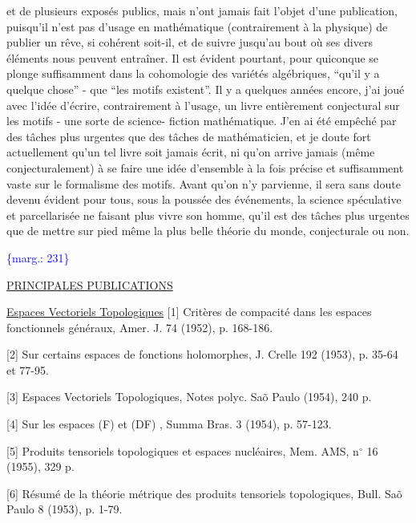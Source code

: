 \documentclass[11pt]{article}
\newcommand{\scanpage}[1]{\par\bigskip\noindent{\small\sffamily[scan #1]}\par}
\newcommand{\mspage}[1]{{\small\sffamily[p.\,#1]}}
\newcommand{\margin}[1]{\textcolor{blue}{\{\textsf{marg.:} #1\}}}
\newcommand{\uline}[1]{\underline{#1}}
\begin{document}
et de plusieurs exposés publics, mais n'ont jamais
fait l'objet d'une publication, puisqu'il n'est pas
d'usage en mathématique (contrairement à la physique)
de publier un rêve, si cohérent soit-il, et de suivre
jusqu'au bout où ses divers éléments nous peuvent entraîner.
Il est évident pourtant, pour quiconque se plonge
suffisamment dans la cohomologie des variétés algébriques,
``qu'il y a quelque chose'' - que ``les motifs existent''.
Il y a quelques années encore, j'ai joué avec l'idée
d'écrire, contrairement à l'usage, un livre entièrement
conjectural sur les motifs - une sorte de science-%
fiction mathématique. J'en ai été empêché par des
tâches plus urgentes que des tâches de mathématicien,
et je doute fort actuellement qu'un tel livre soit
jamais écrit, ni qu'on arrive jamais (même conjecturalement)
à se faire une idée d'ensemble à la fois précise et
suffisamment vaste sur le formalisme des motifs. Avant
qu'on n'y parvienne, il sera sans doute devenu évident
pour tous, sous la poussée des événements, la science
spéculative et parcellarisée ne faisant plus vivre son
homme, qu'il est des tâches plus urgentes que de mettre
sur pied même la plus belle théorie du monde, conjecturale
ou non.

\margin{231}

\clearpage
\scanpage{119/232}
\mspage{. 19 .}

\uline{PRINCIPALES PUBLICATIONS}

\uline{Espaces Vectoriels Topologiques}
[1] Critères de compacité dans les espaces fonctionnels
généraux, Amer. J. 74 (1952), p. 168-186.

[2] Sur certains espaces de fonctions holomorphes,
J. Crelle 192 (1953), p. 35-64 et 77-95.

[3] Espaces Vectoriels Topologiques, Notes polyc.
Sa\~{o} Paulo (1954), 240 p.

[4] Sur les espaces (F) et (DF) , Summa Bras. 3
(1954), p. 57-123.

[5] Produits tensoriels topologiques et espaces
nucléaires, Mem. AMS, n$^\circ$ 16 (1955), 329 p.

[6] Résumé de la théorie métrique des produits
tensoriels topologiques, Bull. Sa\~{o} Paulo 8 (1953),
p. 1-79.
\end{document}
